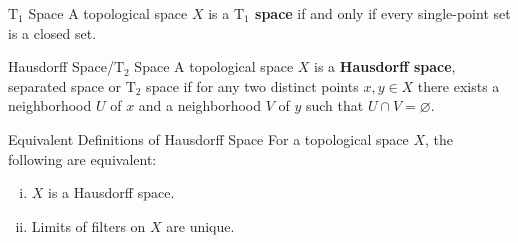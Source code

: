 \documentclass{report}
\begin{document}
\begin{definition}{$\mathrm{T}_1$ Space}{}
	A topological space $X$ is a \textbf{$\mathrm{T}_1$ space} if and only if every single-point set is a closed set.
\end{definition}


\begin{definition}{Hausdorff Space/$\mathrm{T}_2$ Space}{}
	A topological space $X$ is a \textbf{Hausdorff space}, separated space or $\mathrm{T}_2$ space if for any two distinct points $x,y\in X$ there exists a neighborhood $U$ of $x$ and a neighborhood $V$ of $y$ such that $U\cap V=\varnothing$.
\end{definition}

\begin{proposition}{Equivalent Definitions of Hausdorff Space}{}
	For a topological space $X$, the following are equivalent:
	\begin{enumerate}[(i)]
		\item $X$ is a Hausdorff space.
		\item Limits of filters on $X$ are unique.
	\end{enumerate}
\end{proposition}
\end{document}
